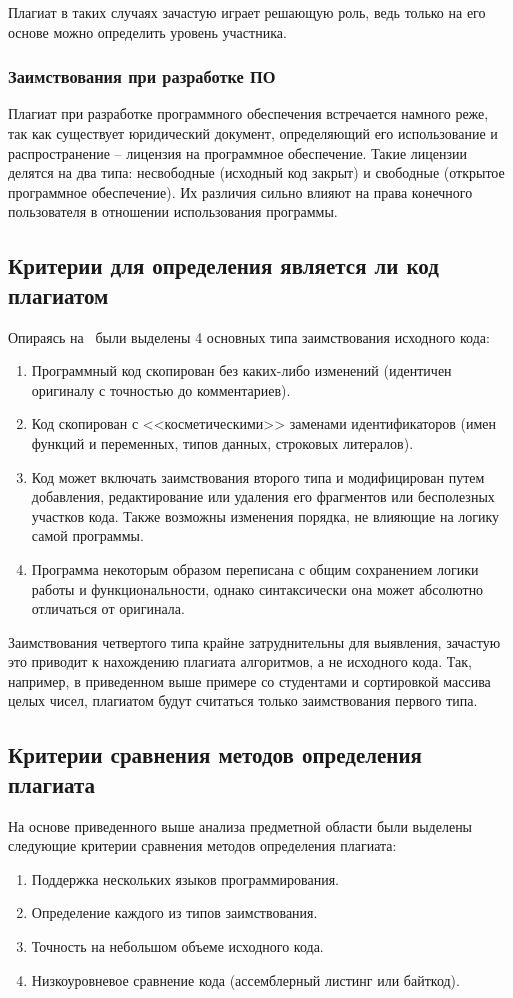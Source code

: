 Плагиат в таких случаях зачастую играет решающую роль, ведь только на его основе можно определить уровень участника.

\subsubsection{Заимствования при разработке ПО}
Плагиат при разработке программного обеспечения встречается намного реже, так как существует юридический документ, определяющий  его использование и распространение -- лицензия на программное обеспечение. Такие лицензии делятся на два типа: несвободные (исходный код закрыт) и свободные (открытое программное обеспечение). Их различия сильно влияют на права конечного пользователя в отношении использования программы.

\subsection{Критерии для определения является ли код плагиатом}
Опираясь на~\cite{treb} были выделены 4 основных типа заимствования исходного кода: 
 \begin{enumerate}
 	\item Программный код скопирован без каких-либо изменений (идентичен оригиналу с точностью до комментариев).
 	\item Код скопирован с <<косметическими>> заменами идентификаторов (имен функций и переменных, типов данных, строковых литералов).
 	\item Код может включать заимствования второго типа и модифицирован путем добавления, редактирование или удаления его фрагментов или бесполезных участков кода. Также возможны изменения порядка, не влияющие на логику самой программы.
 	\item Программа некоторым образом переписана с общим сохранением логики работы и функциональности, однако синтаксически она может абсолютно отличаться от оригинала.
 \end{enumerate}

Заимствования четвертого типа крайне затруднительны для выявления, зачастую это приводит к нахождению плагиата алгоритмов, а не исходного кода. Так, например, в приведенном выше примере со студентами и сортировкой массива целых чисел, плагиатом будут считаться только заимствования первого типа.

\subsection{Критерии сравнения методов определения плагиата}
На основе приведенного выше анализа предметной области были выделены следующие критерии сравнения методов определения плагиата:
\begin{enumerate}
	\item Поддержка нескольких языков программирования.
	\item Определение каждого из типов заимствования.
	\item Точность на небольшом объеме исходного кода. 
	\item Низкоуровневое сравнение кода (ассемблерный листинг или байткод).
\end{enumerate}
\pagebreak